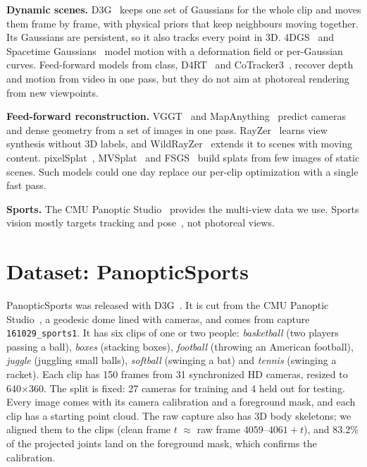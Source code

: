 \documentclass[10pt,twocolumn,letterpaper]{article}
\begin{document}
\noindent\textbf{Dynamic scenes.} D3G~\cite{luiten2024dynamic} keeps one set of Gaussians for the whole clip and moves them frame by frame, with physical priors that keep neighbours moving together. Its Gaussians are persistent, so it also tracks every point in 3D. 4DGS~\cite{wu20244dgs} and Spacetime Gaussians~\cite{li2024spacetime} model motion with a deformation field or per-Gaussian curves. Feed-forward models from class, D4RT~\cite{zhang2025d4rt} and CoTracker3~\cite{karaev2024cotracker3}, recover depth and motion from video in one pass, but they do not aim at photoreal rendering from new viewpoints.

\noindent\textbf{Feed-forward reconstruction.} VGGT~\cite{wang2025vggt} and MapAnything~\cite{keetha2025mapanything} predict cameras and dense geometry from a set of images in one pass. RayZer~\cite{jiang2025rayzer} learns view synthesis without 3D labels, and WildRayZer~\cite{chen2026wildrayzer} extends it to scenes with moving content. pixelSplat~\cite{charatan2024pixelsplat}, MVSplat~\cite{chen2024mvsplat} and FSGS~\cite{zhu2024fsgs} build splats from few images of static scenes. Such models could one day replace our per-clip optimization with a single fast pass.

\noindent\textbf{Sports.} The CMU Panoptic Studio~\cite{joo2015panoptic} provides the multi-view data we use. Sports vision mostly targets tracking and pose~\cite{somers2024soccernet,jiang2024worldpose,skalski2025roboflow}, not photoreal views.

\section{Dataset: PanopticSports}
\label{sec:data}

PanopticSports was released with D3G~\cite{luiten2024dynamic}. It is cut from the CMU Panoptic Studio~\cite{joo2015panoptic}, a geodesic dome lined with cameras, and comes from capture \texttt{161029\_sports1}. It has six clips of one or two people: \emph{basketball} (two players passing a ball), \emph{boxes} (stacking boxes), \emph{football} (throwing an American football), \emph{juggle} (juggling small balls), \emph{softball} (swinging a bat) and \emph{tennis} (swinging a racket). Each clip has 150 frames from 31 synchronized HD cameras, resized to 640$\times$360. The split is fixed: 27 cameras for training and 4 held out for testing. Every image comes with its camera calibration and a foreground mask, and each clip has a starting point cloud. The raw capture also has 3D body skeletons; we aligned them to the clips (clean frame $t$ $\approx$ raw frame $4059$--$4061{+}t$), and 83.2\% of the projected joints land on the foreground mask, which confirms the calibration.
\end{document}
